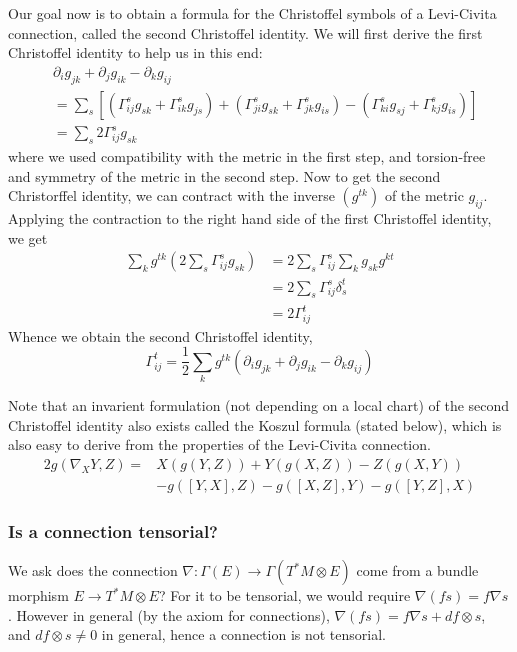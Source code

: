 \documentclass[a4paper]{article}
\theoremstyle{definition} \newtheorem*{definition}{Definition}
\theoremstyle{definition} \newtheorem*{definitions}{Definitions}
\theoremstyle{plain} \newtheorem{theorem}{Theorem}[section]
\theoremstyle{plain} \newtheorem{proposition}[theorem]{Proposition}
\theoremstyle{plain} \newtheorem{corollary}[theorem]{Corollary}
\theoremstyle{plain} \newtheorem{lemma}[theorem]{Lemma}
\theoremstyle{plain} \newtheorem{example}[theorem]{Example}
\begin{document}
Our goal now is to obtain a formula for the Christoffel symbols of a Levi-Civita connection, called the second Christoffel identity. We will first derive the first Christoffel identity to help us in this end:
\begin{align*}
    & \partial_i g_{jk} + \partial_j g_{ik} - \partial_k g_{ij} \\
    & = \sum_s [(\Gamma^s_{ij}g_{sk}+\Gamma^s_{ik}g_{js})+
    (\Gamma^s_{ji}g_{sk}+\Gamma^s_{jk}g_{is})-
    (\Gamma^s_{ki}g_{sj}+\Gamma^s_{kj}g_{is})] \\
    & = \sum_s 2\Gamma^s_{ij}g_{sk}
\end{align*}
where we used compatibility with the metric in the first step, and torsion-free and symmetry of the metric in the second step. Now to get the second Christorffel identity, we can contract with the inverse $(g^{tk})$ of the metric $g_{ij}$. Applying the contraction to the right hand side of the first Christoffel identity, we get
\begin{align*}
    \sum_k g^{tk}(2\sum_s \Gamma^s_{ij}g_{sk}) 
    & = 2\sum_s \Gamma^s_{ij}\sum_k g_{sk}g^{kt} \\
    & = 2 \sum_s \Gamma^s_{ij}\delta^t_s \\
    & = 2\Gamma^t_{ij}
\end{align*}
Whence we obtain the second Christoffel identity,
$$\Gamma^t_{ij} = \frac{1}{2}\sum_k g^{tk}(\partial_i g_{jk} + \partial_j g_{ik} - \partial_k g_{ij})$$

Note that an invarient formulation (not depending on a local chart) of the second Christoffel identity also exists called the Koszul formula (stated below), which is also easy to derive from the properties of the Levi-Civita connection.
\begin{align*}
2g(\nabla_XY, Z) = & X(g(Y,Z))+Y(g(X,Z))-Z(g(X,Y)) \\
& -g([Y,X],Z)-g([X,Z],Y)-g([Y,Z],X)    
\end{align*}

\subsubsection{Is a connection tensorial?}
We ask does the connection $\nabla:\Gamma(E)\to \Gamma(T^*M\otimes E)$ come from a bundle morphism $E\to T^*M\otimes E$? For it to be tensorial, we would require $\nabla(fs)=f\nabla s$. However in general (by the axiom for connections), $\nabla(fs)=f\nabla s + df\otimes s$, and $df\otimes s \neq 0$ in general, hence a connection is not tensorial.
\end{document}
